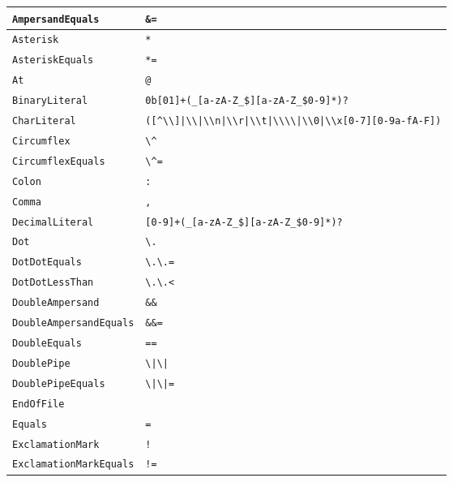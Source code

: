 \begin{xltabular}{\textwidth}{l|X}
	\texttt{AmpersandEquals} & \texttt{\&=} \\ \hline
	\texttt{Asterisk} & \texttt{*} \\ \hline
	\texttt{AsteriskEquals} & \texttt{*=} \\ \hline
	\texttt{At} & \texttt{@} \\ \hline
	\texttt{BinaryLiteral} & \texttt{0b[01]+(\_[a-zA-Z\_\$][a-zA-Z\_\$0-9]*)?}  \\ \hline
	\texttt{CharLiteral} & \texttt{\textquotesingle([\textasciicircum \textquotesingle \textbackslash \textbackslash]|\textbackslash \textbackslash \textquotesingle |\textbackslash \textbackslash n|\textbackslash \textbackslash r|\textbackslash \textbackslash t|\textbackslash\textbackslash\textbackslash\textbackslash|\textbackslash \textbackslash 0|\textbackslash \textbackslash x[0-7][0-9a-fA-F])\textquotesingle} \\ \hline
	\texttt{Circumflex} & \texttt{\textbackslash\textasciicircum} \\ \hline
	\texttt{CircumflexEquals} & \texttt{\textbackslash\textasciicircum=} \\ \hline
	\texttt{Colon} & \texttt{:} \\ \hline
	\texttt{Comma} & \texttt{,} \\ \hline
	\texttt{DecimalLiteral} & \texttt{[0-9]+(\_[a-zA-Z\_\$][a-zA-Z\_\$0-9]*)?} \\ \hline
	\texttt{Dot} & \texttt{\textbackslash .} \\ \hline
	\texttt{DotDotEquals} & \texttt{\textbackslash .\textbackslash .=} \\ \hline
	\texttt{DotDotLessThan} & \texttt{\textbackslash .\textbackslash .<} \\ \hline
	\texttt{DoubleAmpersand} & \texttt{\&\&} \\ \hline
	\texttt{DoubleAmpersandEquals} & \texttt{\&\&=} \\ \hline
	\texttt{DoubleEquals} & \texttt{==} \\ \hline
	\texttt{DoublePipe} & \texttt{\textbackslash |\textbackslash |} \\ \hline
	\texttt{DoublePipeEquals} & \texttt{\textbackslash |\textbackslash |=} \\ \hline
	\texttt{EndOfFile}\footnotemark & \\ \hline
	\texttt{Equals} & \texttt{=} \\ \hline
	\texttt{ExclamationMark} & \texttt{!} \\ \hline
	\texttt{ExclamationMarkEquals} & \texttt{!=} \\ \hline

\end{xltabular}
